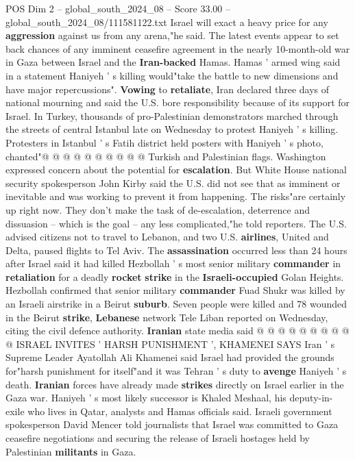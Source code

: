 \begin{textsample}{POS Dim 2 – global\_south\_2024\_08 – Score 33.00 – global\_south\_2024\_08/111581122.txt}
Israel will exact a heavy price for any \textbf{aggression} against us from any arena,"he said.
The latest events appear to set back chances of any imminent ceasefire agreement in the nearly 10-month-old war in Gaza between Israel and the \textbf{Iran-backed} Hamas.
Hamas ' armed wing said in a statement Haniyeh ' s killing would"take the battle to new dimensions and have major repercussions". \textbf{Vowing} to \textbf{retaliate}, Iran declared three days of national mourning and said the U.S. bore responsibility because of its support for Israel.
In Turkey, thousands of pro-Palestinian demonstrators marched through the streets of central Istanbul late on Wednesday to protest Haniyeh ' s killing.
Protesters in Istanbul ' s Fatih district held posters with Haniyeh ' s photo, chanted"@ @ @ @ @ @ @ @ @ @ Turkish and Palestinian flags.
Washington expressed concern about the potential for \textbf{escalation}.
But White House national security spokesperson John Kirby said the U.S. did not see that as imminent or inevitable and was working to prevent it from happening.
The risks"are certainly up right now.
They don't make the task of de-escalation, deterrence and dissuasion -- which is the goal -- any less complicated,"he told reporters.
The U.S. advised citizens not to travel to Lebanon, and two U.S. \textbf{airlines}, United and Delta, paused flights to Tel Aviv.
The \textbf{assassination} occurred less than 24 hours after Israel said it had killed Hezbollah ' s most senior military \textbf{commander} in \textbf{retaliation} for a deadly \textbf{rocket} \textbf{strike} in the \textbf{Israeli-occupied} Golan Heights.
Hezbollah confirmed that senior military \textbf{commander} Fuad Shukr was killed by an Israeli airstrike in a Beirut \textbf{suburb}.
Seven people were killed and 78 wounded in the Beirut \textbf{strike}, \textbf{Lebanese} network Tele Liban reported on Wednesday, citing the civil defence authority. \textbf{Iranian} state media said @ @ @ @ @ @ @ @ @ @ ISRAEL INVITES ' HARSH PUNISHMENT ', KHAMENEI SAYS Iran ' s Supreme Leader Ayatollah Ali Khamenei said Israel had provided the grounds for"harsh punishment for itself"and it was Tehran ' s duty to \textbf{avenge} Haniyeh ' s death. \textbf{Iranian} forces have already made \textbf{strikes} directly on Israel earlier in the Gaza war.
Haniyeh ' s most likely successor is Khaled Meshaal, his deputy-in-exile who lives in Qatar, analysts and Hamas officials said.
Israeli government spokesperson David Mencer told journalists that Israel was committed to Gaza ceasefire negotiations and securing the release of Israeli hostages held by Palestinian \textbf{militants} in Gaza.

\end{textsample}

